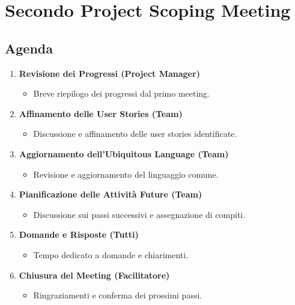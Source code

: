\section{Secondo Project Scoping Meeting}

\subsection{Agenda}

\begin{enumerate}
    \item \textbf{Revisione dei Progressi (Project Manager)}
    \begin{itemize}
        \item Breve riepilogo dei progressi dal primo meeting.
    \end{itemize}
    
    \item \textbf{Affinamento delle User Stories (Team)}
    \begin{itemize}
        \item Discussione e affinamento delle user stories identificate.
    \end{itemize}
    
    \item \textbf{Aggiornamento dell'Ubiquitous Language (Team)}
    \begin{itemize}
        \item Revisione e aggiornamento del linguaggio comune.
    \end{itemize}
    
    \item \textbf{Pianificazione delle Attività Future (Team)}
    \begin{itemize}
        \item Discussione sui passi successivi e assegnazione di compiti.
    \end{itemize}
    
    \item \textbf{Domande e Risposte (Tutti)}
    \begin{itemize}
        \item Tempo dedicato a domande e chiarimenti.
    \end{itemize}
    
    \item \textbf{Chiusura del Meeting (Facilitatore)}
    \begin{itemize}
        \item Ringraziamenti e conferma dei prossimi passi.
    \end{itemize}
\end{enumerate}

